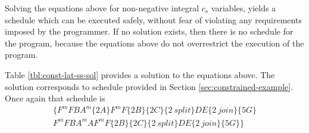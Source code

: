 Solving the equations above for non-negative integral $c_s$
variables, yields a schedule which can be executed safely, without
fear of violating any requirements imposed by the programmer.  If
no solution exists, then there is no schedule for the program,
because the equations above do not overrestrict the execution of
the program.

Table \ref{tbl:const-lat-ss-sol} provides a solution to the
equations above.  The solution corresponds to schedule provided in
Section \ref{sec:constrained-example}. Once again that schedule is
$$ \begin{array}{c}\{ F^mFB A^m\{2A\} F^mF \{2B\} \{2C\} \{2\ split\} DE \{2\
join\} \{5G\} \\F^mF B A^mA F^mF \{2B\} \{2C\} \{2\ split\} DE
\{2\ join\} \{5G\} \} \end{array}
$$

